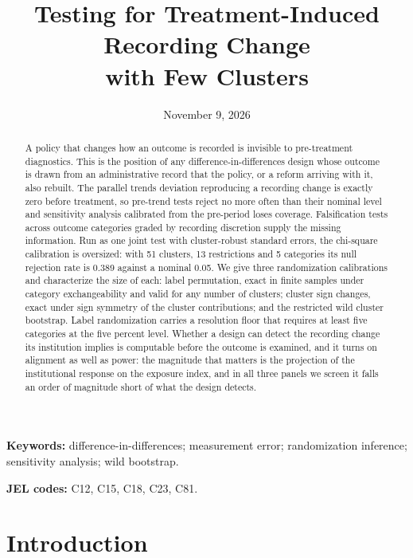 \documentclass[12pt]{article}
\title{Testing for Treatment-Induced Recording Change\\[2pt]
with Few Clusters}
\author{}
\date{November 9, 2026}
\theoremstyle{definition}
\numberwithin{equation}{section}
\begin{document}
\maketitle

\begin{abstract}
\noindent
A policy that changes how an outcome is recorded is invisible to pre-treatment
diagnostics. This is the position of any difference-in-differences design whose
outcome is drawn from an administrative record that the policy, or a reform
arriving with it, also rebuilt. The parallel trends deviation reproducing a recording change is
exactly zero before treatment, so pre-trend tests reject no more often than
their nominal level and sensitivity analysis calibrated from the pre-period loses coverage. Falsification tests across outcome categories graded by
recording discretion supply the missing information. Run as one joint test with
cluster-robust standard errors, the chi-square calibration is oversized: with
51 clusters, 13 restrictions and 5 categories its null rejection rate is 0.389
against a nominal 0.05. We give three randomization calibrations and
characterize the size of each: label permutation, exact in finite samples under
category exchangeability and valid for any number of clusters; cluster sign
changes, exact under sign symmetry of the cluster contributions; and the
restricted wild cluster bootstrap. Label randomization carries a resolution
floor that requires at least five categories at the five percent level. Whether
a design can detect the recording change its institution implies is computable
before the outcome is examined, and it turns on alignment as well as power: the
magnitude that matters is the projection of the institutional response on the
exposure index, and in all three panels we screen it falls an order of magnitude
short of what the design detects.
\end{abstract}

\smallskip
\noindent\textbf{Keywords:} difference-in-differences; measurement error; randomization inference; sensitivity analysis; wild bootstrap.


\smallskip
\noindent\textbf{JEL codes:} C12, C15, C18, C23, C81.

\newpage
\doublespacing

\section{Introduction}
\label{sec:intro}
\end{document}
